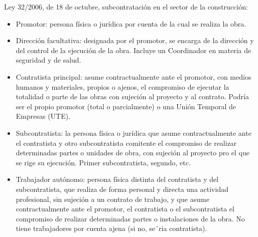 Ley 32/2006, de 18 de octubre, subcontratación en el sector de la construcción:
\begin{itemize}
    \item Promotor: persona física o jurídica por cuenta de la cual se realiza la obra.
    \item Dirección facultativa: designada por el promotor, se encarga de la dirección y del control de la ejecución de la obra. Incluye un Coordinador en materia de seguridad y de salud.
    \item Contratista principal: asume contractualmente ante el promotor, con medios humanos y materiales, propios o ajenos, el compromiso de ejecutar la totalidad o parte de las obras con sujeción al proyecto y al contrato. Podría ser el propio promotor (total o parcialmente) o una Unión Temporal de Empresas (UTE).
    \item Subcontratista: la persona física o jurídica que asume contractualmente ante el contratista y otro subcontratista comitente el compromiso de realizar determinadas partes o unidades de obra, con sujeción al proyecto pro el que se rige su ejecución. Primer subcontratista, segundo, etc.
    \item Trabajador autónomo: persona física distinta del contratista y del subcontratista, que realiza de forma personal y directa una actividad profesional, sin sujeción a un contrato de trabajo, y que asume contractualmente ante el promotor, el contratista o el subcontratista el compromiso de realizar determinadas partes o instalaciones de la obra. No tiene trabajadores por cuenta ajena (si no, se´ria contratista).
\end{itemize}

